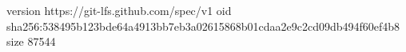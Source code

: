 version https://git-lfs.github.com/spec/v1
oid sha256:538495b123bde64a4913bb7eb3a02615868b01cdaa2e9c2cd09db494f60ef4b8
size 87544
